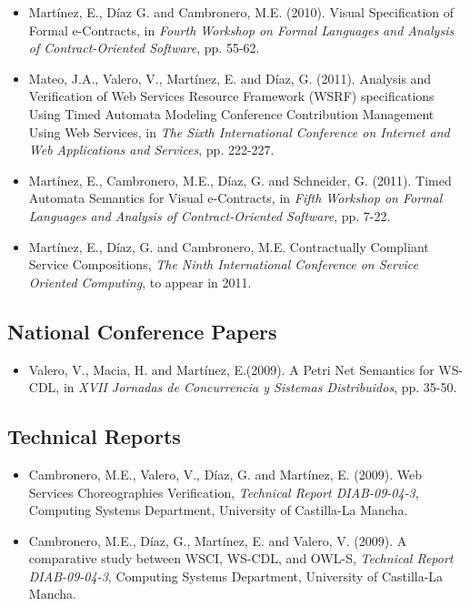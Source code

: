 \begin{itemize}
\item
Mart\'inez, E., D\'iaz G. and Cambronero, M.E. (2010). Visual Specification of Formal e-Contracts, in \emph{Fourth Workshop on Formal Languages and Analysis of Contract-Oriented Software}, pp. 55-62.

\item
Mateo, J.A., Valero, V., Mart\'inez, E. and D\'iaz, G. (2011). Analysis and Verification of Web Services Resource Framework (WSRF) specifications Using Timed Automata Modeling Conference Contribution Management Using Web Services, in \emph{The Sixth International Conference on Internet and Web Applications and Services}, pp. 222-227.

\item
Mart\'inez, E., Cambronero, M.E., D\'iaz, G. and Schneider, G. (2011). Timed Automata Semantics for Visual e-Contracts, in \emph{Fifth Workshop on Formal Languages and Analysis of Contract-Oriented Software}, pp. 7-22.

\item
Mart\'inez, E., D\'iaz, G. and Cambronero, M.E. Contractually Compliant Service Compositions, \emph{The Ninth International Conference on Service Oriented Computing}, to appear in 2011.

\end{itemize}

\subsection{National Conference Papers}

\begin{itemize}

\item 
Valero, V., Macia, H. and Mart\'inez, E.(2009). A Petri Net Semantics for WS-CDL, in \emph{XVII Jornadas de Concurrencia y Sistemas Distribuidos}, pp. 35-50.

\end{itemize}

\subsection{Technical Reports}

\begin{itemize}

\item Cambronero, M.E., Valero, V., D\'iaz, G. and Mart\'inez, E. (2009). Web Services Choreographies Verification, \emph{Technical Report DIAB-09-04-3}, Computing Systems Department, University of Castilla-La Mancha.

\item Cambronero, M.E., D\'iaz, G., Mart\'inez, E. and Valero, V. (2009). A comparative study between WSCI, WS-CDL, and OWL-S, \emph{Technical Report DIAB-09-04-3}, Computing Systems Department, University of Castilla-La Mancha.

\end{itemize}


